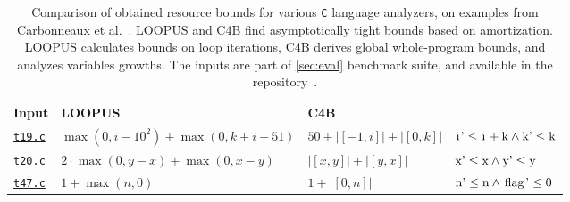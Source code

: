\begin{table}[t]
\caption{%
Comparison of obtained resource bounds for various \texttt{C} language analyzers, on examples from Carbonneaux et al.~\cite[p.~26]{Carbonneaux2015}.
LOOPUS and C4B find asymptotically tight bounds based on amortization. 
LOOPUS calculates bounds on loop iterations, C4B derives global whole-program bounds, and \pymwp analyzes variables growths.
The inputs are part of \autoref{sec:eval} benchmark suite, and available in the \pymwp repository~\cite{pymwp_source}.%
}
\begin{tabularx}{\textwidth}{p{1cm}lXl}
	\toprule
	Input & LOOPUS & C4B & \pymwp \\
    \midrule
    \href{https://github.com/statycc/pymwp/blob/c6887d8e8a2c2b0e2a6b7ad960851ec693c603d3/c_files/tool_paper/t19_c4b.c}{\texttt{t19.c}} & $\max(0,i-10^2)+\max (0,k+i+51)$ \; & $50+|[-1, i]| + |[0,k]|$ & $\text{\prc|i|'} \leq \text{\prc|i|} + \text{\prc|k|} \land \text{\prc|k|'} \leq \text{\prc|k|}$ \\
    \href{https://github.com/statycc/pymwp/blob/c6887d8e8a2c2b0e2a6b7ad960851ec693c603d3/c_files/tool_paper/t20_c4b.c}{\texttt{t20.c}} & $2\cdot\max (0,y-x)+\max (0,x-y)$ & $|[x,y]|+|[y,x]|$ & $\text{\prc|x|'} \leq \text{\prc|x|} \land \text{\prc|y|'} \leq \text{\prc|y|}$ \\
    \href{https://github.com/statycc/pymwp/blob/c6887d8e8a2c2b0e2a6b7ad960851ec693c603d3/c_files/tool_paper/t47_c4b.c}{\texttt{t47.c}} & $1+\max (n,0)$          & $1+|[0,n]|$ & $\text{\prc|n|'} \leq \text{\prc|n|} \land \text{\prc|flag|'} \leq 0$ \\
	\bottomrule        
\end{tabularx}

\label{tab:compare}
\end{table}
